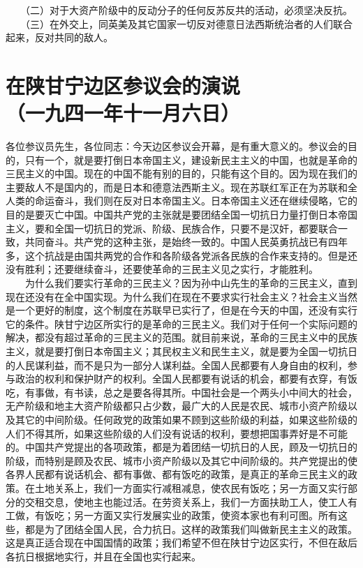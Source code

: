 \documentclass[cn,11pt,chinese]{elegantbook}
\def\myformat#1{\hfil\hfil #1}
\begin{document}
　　（二）对于大资产阶级中的反动分子的任何反苏反共的活动，必须坚决反抗。\\
　　（三）在外交上，同英美及其它国家一切反对德意日法西斯统治者的人们联合起来，反对共同的敌人。\\
\newpage\section*{\myformat{在陕甘宁边区参议会的演说}\\\myformat{（一九四一年十一月六日）}}
各位参议员先生，各位同志：今天边区参议会开幕，是有重大意义的。参议会的目的，只有一个，就是要打倒日本帝国主义，建设新民主主义的中国，也就是革命的三民主义的中国。现在的中国不能有别的目的，只能有这个目的。因为现在我们的主要敌人不是国内的，而是日本和德意法西斯主义。现在苏联红军正在为苏联和全人类的命运奋斗，我们则在反对日本帝国主义。日本帝国主义还在继续侵略，它的目的是要灭亡中国。中国共产党的主张就是要团结全国一切抗日力量打倒日本帝国主义，要和全国一切抗日的党派、阶级、民族合作，只要不是汉奸，都要联合一致，共同奋斗。共产党的这种主张，是始终一致的。中国人民英勇抗战已有四年多，这个抗战是由国共两党的合作和各阶级各党派各民族的合作来支持的。但是还没有胜利；还要继续奋斗，还要使革命的三民主义见之实行，才能胜利。\\
　　为什么我们要实行革命的三民主义？因为孙中山先生的革命的三民主义，直到现在还没有在全中国实现。为什么我们在现在不要求实行社会主义？社会主义当然是一个更好的制度，这个制度在苏联早已实行了，但是在今天的中国，还没有实行它的条件。陕甘宁边区所实行的是革命的三民主义。我们对于任何一个实际问题的解决，都没有超过革命的三民主义的范围。就目前来说，革命的三民主义中的民族主义，就是要打倒日本帝国主义；其民权主义和民生主义，就是要为全国一切抗日的人民谋利益，而不是只为一部分人谋利益。全国人民都要有人身自由的权利，参与政治的权利和保护财产的权利。全国人民都要有说话的机会，都要有衣穿，有饭吃，有事做，有书读，总之是要各得其所。中国社会是一个两头小中间大的社会，无产阶级和地主大资产阶级都只占少数，最广大的人民是农民、城市小资产阶级以及其它的中间阶级。任何政党的政策如果不顾到这些阶级的利益，如果这些阶级的人们不得其所，如果这些阶级的人们没有说话的权利，要想把国事弄好是不可能的。中国共产党提出的各项政策，都是为着团结一切抗日的人民，顾及一切抗日的阶级，而特别是顾及农民、城市小资产阶级以及其它中间阶级的。共产党提出的使各界人民都有说话机会、都有事做、都有饭吃的政策，是真正的革命三民主义的政策。在土地关系上，我们一方面实行减租减息，使农民有饭吃；另一方面又实行部分的交租交息，使地主也能过活。在劳资关系上，我们一方面扶助工人，使工人有工做，有饭吃；另一方面又实行发展实业的政策，使资本家也有利可图。所有这些，都是为了团结全国人民，合力抗日。这样的政策我们叫做新民主主义的政策。这是真正适合现在中国国情的政策；我们希望不但在陕甘宁边区实行，不但在敌后各抗日根据地实行，并且在全国也实行起来。\\
\end{document}
